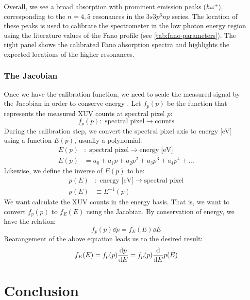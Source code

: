 Overall, we see a broad absorption with prominent emission peaks ($\hbar \omega^+$), corresponding to the $n=4,5$ resonances in the $3s3p^6np$ series. The location of these peaks is used to calibrate the spectrometer in the low photon energy region using the literature values of the Fano profile (see \cref{tab:fano-parameters}). The right panel shows the calibrated Fano absorption spectra and highlights the expected locations of the higher resonances.


\subsubsection{The Jacobian}
\label{sec:jacobian}

Once we have the calibration function, we need to scale the measured signal by the Jacobian in order to conserve energy \cite{mooneyGetBasicsRight2013}. Let $f_p(p)$ be the function that represents the measured XUV counts at spectral pixel $p$:
\begin{equation}
f_p(p): \textrm{ spectral pixel} \rightarrow \textrm{counts}
\end{equation}
During the calibration step, we convert the spectral pixel axis to energy [eV] using a function $E(p)$, usually a polynomial:
\begin{align}
E(p)&: \textrm{ spectral pixel} \rightarrow \textrm{energy [eV]} \\
E(p) &= a_0 + a_1 p + a_2 p^2 + a_3 p^3 + a_4 p^4 + ...
\end{align}
Likewise, we define the inverse of $E(p)$ to be:
\begin{align}
p(E)&: \textrm{ energy [eV]} \rightarrow \textrm{spectral pixel} \\
p(E) &\equiv E^{-1}(p)
\end{align}
We want calculate the XUV counts in the energy basis. That is, we want to convert $f_p(p)$ to $f_E(E)$ using the Jacobian. By conservation of energy, we have the relation:
\begin{equation}
f_p (p) \dd{p} = f_E (E) \dd{E}
\end{equation}
Rearangement of the above equation leads us to the desired result:
\begin{equation}
f_E (E) = f_p (p) \dv{p}{E} = f_p (p) \dv{E} p(E)
\end{equation}

\section{Conclusion}

